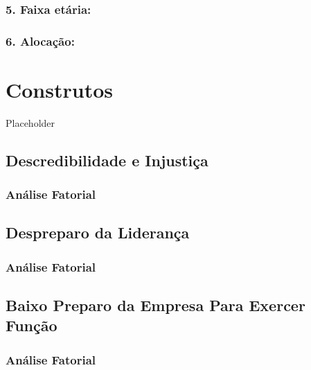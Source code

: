 \documentclass[]{book}
\begin{document}
\hypertarget{faixa-etaria-67}{%
\subsection{5. Faixa etária:}\label{faixa-etaria-67}}

\hypertarget{alocacao-67}{%
\subsection{6. Alocação:}\label{alocacao-67}}

\hypertarget{construtos}{%
\chapter{Construtos}\label{construtos}}

Placeholder

\hypertarget{descredibilidade-e-injustica}{%
\section{Descredibilidade e Injustiça}\label{descredibilidade-e-injustica}}

\hypertarget{analise-fatorial}{%
\subsection{Análise Fatorial}\label{analise-fatorial}}

\hypertarget{despreparo-da-lideranca}{%
\section{Despreparo da Liderança}\label{despreparo-da-lideranca}}

\hypertarget{analise-fatorial-1}{%
\subsection{Análise Fatorial}\label{analise-fatorial-1}}

\hypertarget{baixo-preparo-da-empresa-para-exercer-funcao}{%
\section{Baixo Preparo da Empresa Para Exercer Função}\label{baixo-preparo-da-empresa-para-exercer-funcao}}

\hypertarget{analise-fatorial-2}{%
\subsection{Análise Fatorial}\label{analise-fatorial-2}}
\end{document}
